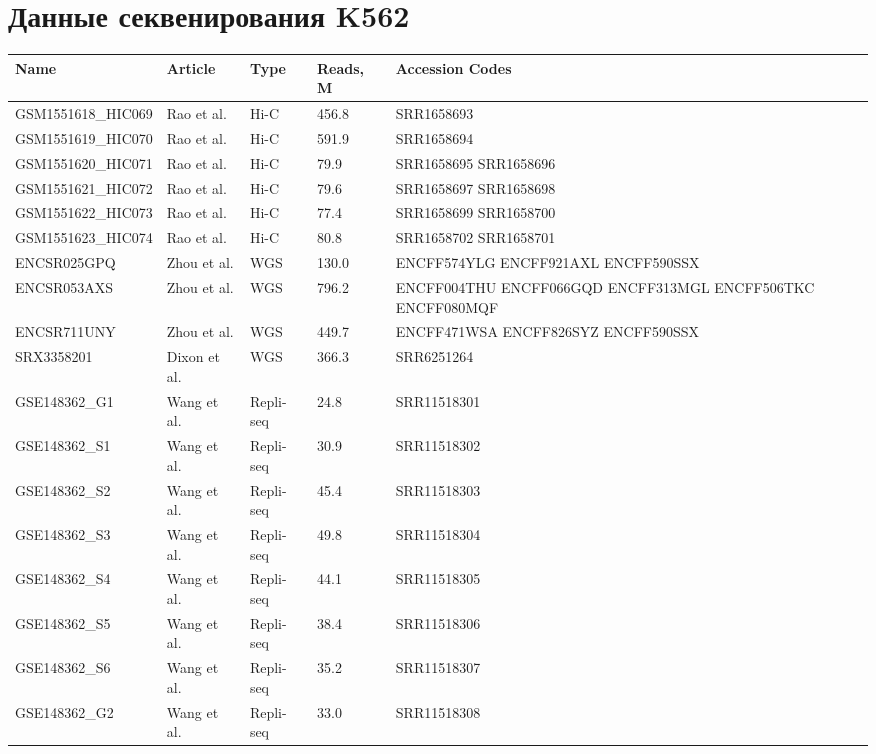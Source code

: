 \documentclass[a4paper,12pt]{article}
\begin{document}
\newpage
\appendix

\section{Данные секвенирования K562}

\label{appendix:accession}

\bgroup
\def\arraystretch{1.5}
\begin{tabular}{| l | l | l | l | p{3cm} |}
\hline
\textbf{Name} & \textbf{Article} & \textbf{Type} & \textbf{Reads, M} & \textbf{Accession Codes} \\
\hline
GSM1551618\_HIC069 & Rao et al.\cite{rao} & Hi-C & 456.8 & SRR1658693 \\
\hline
GSM1551619\_HIC070 & Rao et al.\cite{rao} & Hi-C & 591.9 & SRR1658694 \\
\hline
GSM1551620\_HIC071 & Rao et al.\cite{rao} & Hi-C & 79.9 & SRR1658695 SRR1658696 \\
\hline
GSM1551621\_HIC072 & Rao et al.\cite{rao} & Hi-C & 79.6 & SRR1658697 SRR1658698 \\
\hline
GSM1551622\_HIC073 & Rao et al.\cite{rao} & Hi-C & 77.4 & SRR1658699 SRR1658700 \\
\hline
GSM1551623\_HIC074 & Rao et al.\cite{rao} & Hi-C & 80.8 & SRR1658702 SRR1658701 \\
\hline
ENCSR025GPQ & Zhou et al.\cite{zhou} & WGS & 130.0 & ENCFF574YLG ENCFF921AXL ENCFF590SSX \\
\hline
ENCSR053AXS & Zhou et al.\cite{zhou} & WGS & 796.2 & ENCFF004THU ENCFF066GQD ENCFF313MGL ENCFF506TKC ENCFF080MQF \\
\hline
ENCSR711UNY & Zhou et al.\cite{zhou} & WGS & 449.7 & ENCFF471WSA ENCFF826SYZ ENCFF590SSX \\
\hline
SRX3358201 & Dixon et al.\cite{dixon} & WGS & 366.3 & SRR6251264 \\
\hline
GSE148362\_G1 & Wang et al.\cite{wang} & Repli-seq & 24.8 & SRR11518301 \\
\hline
GSE148362\_S1 & Wang et al.\cite{wang} & Repli-seq & 30.9 & SRR11518302 \\
\hline
GSE148362\_S2 & Wang et al.\cite{wang} & Repli-seq & 45.4 & SRR11518303 \\
\hline
GSE148362\_S3 & Wang et al.\cite{wang} & Repli-seq & 49.8 & SRR11518304 \\
\hline
GSE148362\_S4 & Wang et al.\cite{wang} & Repli-seq & 44.1 & SRR11518305 \\
\hline
GSE148362\_S5 & Wang et al.\cite{wang} & Repli-seq & 38.4 & SRR11518306 \\
\hline
GSE148362\_S6 & Wang et al.\cite{wang} & Repli-seq & 35.2 & SRR11518307 \\
\hline
GSE148362\_G2 & Wang et al.\cite{wang} & Repli-seq & 33.0 & SRR11518308 \\
\hline
\end{tabular}
\end{document}

